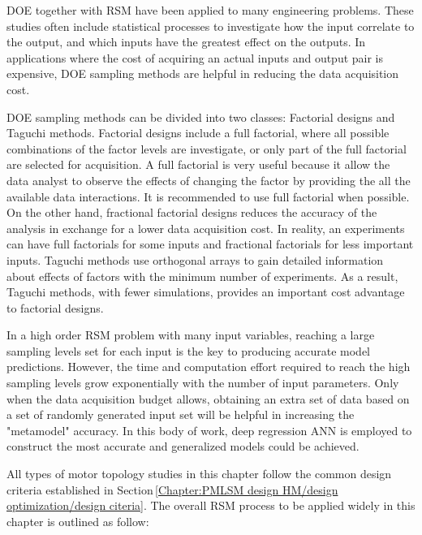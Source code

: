     
        \acf{DOE} together with \ac{RSM} have been applied to many engineering problems. These studies often include statistical processes to investigate how the input correlate to the output, and which inputs have the greatest effect on the outputs. In applications where the cost of acquiring an actual inputs and output pair is expensive, \ac{DOE} sampling methods are helpful in reducing the data acquisition cost. 
        
        
        \ac{DOE} sampling methods can be divided into two classes: Factorial designs and Taguchi methods. Factorial designs include a full factorial, where all possible combinations of the factor levels are investigate, or only part of the full factorial are selected for acquisition. A full factorial is very useful because it allow the data analyst to observe the effects of changing the factor by providing the all the available data interactions. It is recommended to use full factorial when possible. On the other hand, fractional factorial designs reduces the accuracy of the analysis in exchange for a lower data acquisition cost. In reality, an experiments can have full factorials for some inputs and fractional factorials for less important inputs. Taguchi methods use orthogonal arrays to gain detailed information about effects of factors with the minimum number of experiments. As a result, Taguchi methods, with fewer simulations, provides an important cost advantage to factorial designs. 
        
        
        In a high order \ac{RSM} problem  with many input variables, reaching a large sampling levels set for each input is the key to producing accurate model predictions. However, the time and computation effort required to reach the high sampling levels grow exponentially with the number of input parameters. Only when the data acquisition budget allows, obtaining an extra set of data based on a set of randomly generated input set will be helpful in increasing the "metamodel" accuracy. In this body of work, deep regression \acf{ANN} is employed to construct the most accurate and generalized models could be achieved.
        
        
        All types of motor topology studies in this chapter follow the common design criteria established in Section\,\ref{Chapter:PMLSM design HM/design optimization/design citeria}. The overall \ac{RSM} process to be applied widely in this chapter is outlined as follow:
        
